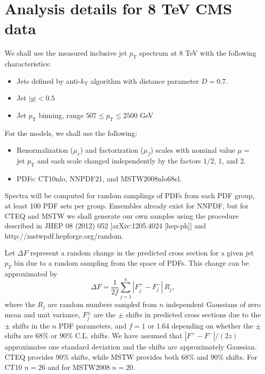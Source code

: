 \documentclass[aps,prd,preprint,nofootinbib]{revtex4}
\begin{document}
\section{Analysis details for 8 TeV CMS data}
We shall use the measured inclusive jet $p_\text{T}$ spectrum at 8 TeV with the following
characteristics: 

\begin{itemize}
\item Jets defined by anti-$k_\text{T}$ algorithm with distance parameter $D = 0.7$.
\item Jet $|y| < 0.5$
\item Jet $p_\text{T}$ binning, range $507 \leq p_\text{T} \leq 2500$ GeV
%
\end{itemize}
\noindent
For the models, we shall use the following:
\begin{itemize}
\item Renormalization ($\mu_r$) and factorization ($\mu_f$) scales with nominal value $\mu = $ jet $p_\text{T}$ and each scale changed independently by the factors $1/2$, 1, and 2.

\item PDFs: CT10nlo, NNPDF21, and MSTW2008nlo68cl. 
\end{itemize}

Spectra will be computed for random samplings of PDFs from each PDF group, at least 100 PDF sets per group.  Ensembles already exist for NNPDF, but for CTEQ and MSTW we shall generate our own samples using the procedure described in JHEP 08 (2012) 052 [arXiv:1205.4024 [hep-ph]] and http://mstwpdf.hepforge.org/random.

Let $\Delta F$ represent a random change in the predicted cross section for a given jet $p_T$ bin due to a random sampling from the space of PDFs. This change can be approximated by 
\begin{equation}
	\Delta F = \frac{1}{2f} \sum_{j=1}^n |F^{+}_j - F^{-}_j| \, R_j,
\end{equation} 
where the $R_j$ are random numbers sampled from $n$ independent Gaussians of zero mean
and unit variance, $F^\pm_j$ are the $\pm$ shifts in predicted cross sections due to the
$\pm$ shifts in the $n$ PDF parameters, and $f = 1 \text{ or } 1.64$ depending on whether the $\pm$ shifts are 68\% or 90\% C.L. shifts. We have assumed that $|F^+ - F^-|/(2z)$ approximates one standard deviation and the shifts are approximately Gaussian. CTEQ provides 90\% shifts, while MSTW provides both 68\% and 90\% shifts. For CT10 $n = 26$ and for MSTW2008 $n = 20$. 
\end{document}
